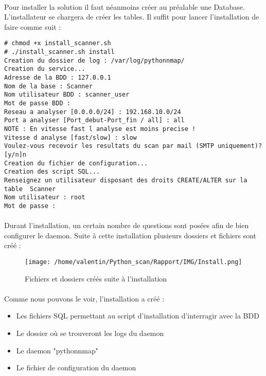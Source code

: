 \documentclass[12pt]{report}
\begin{document}
		\paragraph{}
			Pour installer la solution il faut néanmoins créer au préalable une Database. L'installateur se chargera de créer les tables. Il suffit pour lancer l'installation de faire comme suit :
			\begin{lstlisting}[caption=Installation, captionpos=b]
# chmod +x install_scanner.sh 
# ./install_scanner.sh install
Creation du dossier de log : /var/log/pythonnmap/
Creation du service...
Adresse de la BDD : 127.0.0.1
Nom de la base : Scanner
Nom utilisateur BDD : scanner_user
Mot de passe BDD : 
Reseau a analyser [0.0.0.0/24] : 192.168.10.0/24
Port a analyser [Port_debut-Port_fin / all] : all
NOTE : En vitesse fast l analyse est moins precise !
Vitesse d analyse [fast/slow] : slow
Voulez-vous recevoir les resultats du scan par mail (SMTP uniquement)? [y/n]n
Creation du fichier de configuration...
Creation des script SQL...
Renseignez un utilisateur disposant des droits CREATE/ALTER sur la table  Scanner
Nom utilisateur : root
Mot de passe :
			\end{lstlisting}
		\paragraph{}
			Durant l'installation, un certain nombre de questions sont posées afin de bien configurer le daemon. Suite à cette installation plusieurs dossiers et fichiers sont créé :
			\begin{figure}[ht]
				\begin{center}\texttt{[image: /home/valentin/Python\_scan/Rapport/IMG/Install.png]}
				\caption{\label{create_file} Fichiers et dossiers créés suite à l'installation}\end{center}
			\end{figure}
		\paragraph{}
			Comme nous pouvons le voir, l'installation a créé :
			\begin{itemize}
				\item Les fichiers SQL permettant au script d'installation d'interragir avec la BDD
				\item Le dossier où se trouveront les logs du daemon
				\item Le daemon "pythonnmap"
				\item Le fichier de configuration du daemon
			\end{itemize}
\end{document}
